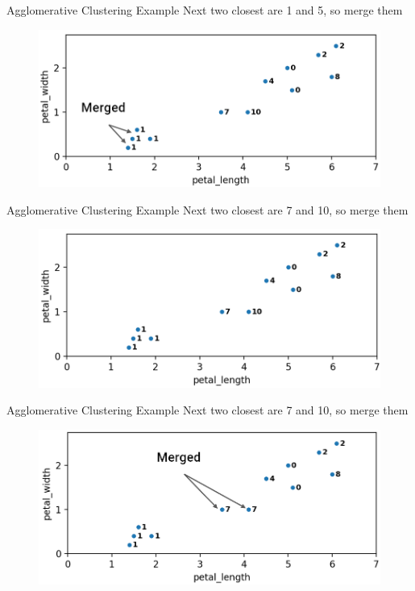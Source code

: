 \documentclass[aspectratio=169]{../latex_main/tntbeamer}  %
\begin{document}
	
	
	\begin{frame}{Agglomerative Clustering Example}
	    Next two closest are 1 and 5, so merge them
	    \begin{figure}
	        \centering
	        \includegraphics[scale=.35]{Bild39}
	    \end{figure}
	\end{frame}
	
	
	
	\begin{frame}{Agglomerative Clustering Example}
	    Next two closest are 7 and 10, so merge them
	    \begin{figure}
	        \centering
	        \includegraphics[scale=.35]{Bild40}
	    \end{figure}
	\end{frame}
	
	
	
	\begin{frame}{Agglomerative Clustering Example}
	    Next two closest are 7 and 10, so merge them
	    \begin{figure}
	        \centering
	        \includegraphics[scale=.35]{Bild41}
	    \end{figure}
	\end{frame}
	
\end{document}
